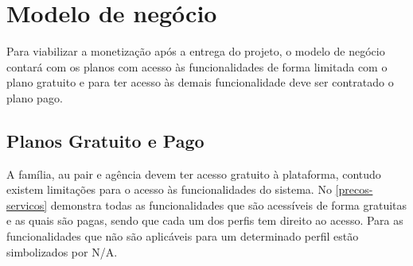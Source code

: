\section{Modelo de negócio}

Para viabilizar a monetização após a entrega do projeto, o modelo de negócio contará com os planos com acesso às funcionalidades de forma limitada com o plano gratuito e para ter acesso às demais funcionalidade deve ser contratado o plano pago.

\subsection{Planos Gratuito e Pago}

A família, au pair e agência devem ter acesso gratuito à plataforma, contudo existem limitações para o acesso às funcionalidades do sistema. No \autoref{precos-servicos} demonstra todas as funcionalidades que são acessíveis de forma gratuitas e as quais são pagas, sendo que cada um dos perfis tem direito ao acesso. Para as funcionalidades que não são aplicáveis para um determinado perfil estão simbolizados por N/A.


